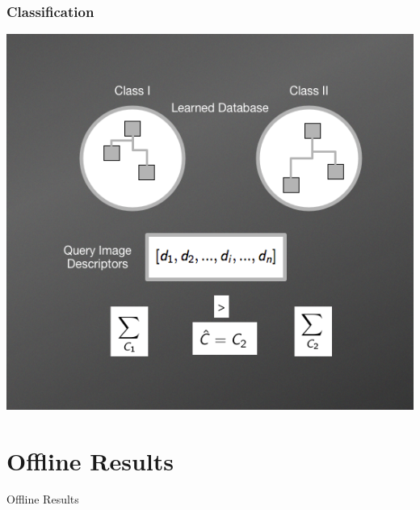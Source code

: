 \documentclass[11pt]{beamer}
\begin{document}
    \begin{frame}
        \frametitle{Classification}
        \begin{center}
            \item \includegraphics[scale=0.38]{img/NBNNMethod5.png}     
        \end{center}
    \end{frame}    
    
    
    \section{Offline Results}
    \begin{frame}
        \begin{center}
            \LARGE Offline Results   
        \end{center}
    \end{frame}
    
\end{document}
